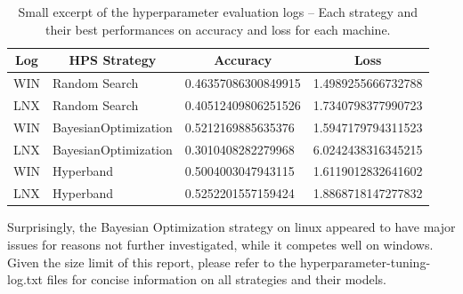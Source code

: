 \begin{table}[H]
  \centering
  \begin{tabular}{|l|l|l|l|}\hline
    \multicolumn{1}{|c|}{Log} & \multicolumn{1}{|c|}{HPS Strategy}   & \multicolumn{1}{|c|}{Accuracy} & \multicolumn{1}{|c|}{Loss} \\\hline
    WIN & Random Search           & 0.46357086300849915 & 1.4989255666732788 \\
    LNX & Random Search           & 0.40512409806251526 & 1.7340798377990723 \\
    WIN & BayesianOptimization    & 0.5212169885635376  & 1.5947179794311523 \\
    LNX & BayesianOptimization    & 0.3010408282279968  & 6.0242438316345215 \\
    WIN & Hyperband               & 0.5004003047943115  & 1.6119012832641602 \\
    LNX & Hyperband               & 0.5252201557159424  & 1.8868718147277832 \\\hline
  \end{tabular}
  \caption{Small excerpt of the hyperparameter evaluation logs -- Each strategy and their best performances on accuracy and loss for each machine.}
  \label{tab:hps_strategy_comparison}
\end{table}
Surprisingly, the Bayesian Optimization strategy on linux appeared to have major issues for reasons not further investigated, while it competes well on windows.
Given the size limit of this report, please refer to the hyperparameter-tuning-log.txt files for concise information on all strategies and their models.

